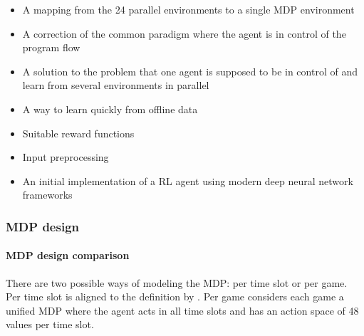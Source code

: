 \begin{itemize}
    \itemsep0em
    \item A mapping from the 24 parallel environments to a single \ac{MDP} environment
    \item A correction of the common paradigm where the agent is in control of the program flow
    \item A solution to the problem that one agent is supposed to be in control of and learn from several
        environments in parallel
    \item A way to learn quickly from offline data
    \item Suitable reward functions
    \item Input preprocessing
    \item An initial implementation of a \ac{RL} agent using modern deep neural network frameworks
\end{itemize}

\subsubsection{MDP design}%
\label{sub:mdp_modelling_comparison}

\paragraph{\ac{MDP} design comparison}%
\label{ssub:mdp_design_comparison}

There are two possible ways of modeling the \ac{MDP}: per time slot or per game. Per time slot is aligned to the
definition by \citet{tactexurieli2016mdp}. Per game considers each game a unified \ac{MDP} where the agent acts in all
time slots and has an action space of 48 values per time slot.


